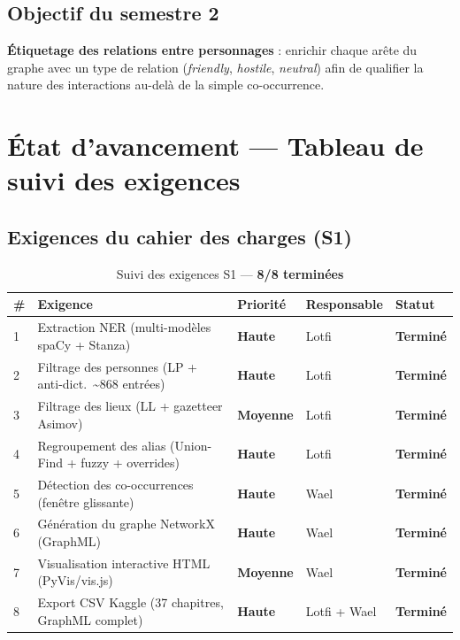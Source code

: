 \documentclass[a4paper,11pt]{article}
\newcommand{\done}{\textcolor{done}{\textbf{Terminé}}}
\newcommand{\high}{\textcolor{red!70!black}{\textbf{Haute}}}
\newcommand{\med}{\textcolor{orange!80!black}{\textbf{Moyenne}}}
\begin{document}
\subsection{Objectif du semestre 2}

\textbf{Étiquetage des relations entre personnages} : enrichir chaque arête du graphe avec un type
de relation (\textit{friendly}, \textit{hostile}, \textit{neutral}) afin de qualifier la nature des
interactions au-delà de la simple co-occurrence.

\section{État d'avancement --- Tableau de suivi des exigences}

\subsection{Exigences du cahier des charges (S1)}

\setlength{\tabcolsep}{5pt}
\renewcommand{\arraystretch}{1.25}

\begin{table}[H]
  \centering
  \footnotesize
  \begin{tabularx}{\textwidth}{>{\centering}p{0.4cm}
                               X
                               >{\centering}p{1.5cm}
                               >{\centering}p{2.0cm}
                               >{\centering\arraybackslash}p{1.8cm}}
    \toprule
    \textbf{\#} & \textbf{Exigence} & \textbf{Priorité} & \textbf{Responsable} & \textbf{Statut} \\
    \midrule
    \rowcolor{rowdone}1 & Extraction NER (multi-modèles spaCy + Stanza) & \high & Lotfi & \done \\
    \rowcolor{rowdone}2 & Filtrage des personnes (LP + anti-dict.\ \textasciitilde{}868 entrées) & \high & Lotfi & \done \\
    \rowcolor{rowdone}3 & Filtrage des lieux (LL + gazetteer Asimov) & \med & Lotfi & \done \\
    \rowcolor{rowdone}4 & Regroupement des alias (Union-Find + fuzzy + overrides) & \high & Lotfi & \done \\
    \rowcolor{rowdone}5 & Détection des co-occurrences (fenêtre glissante) & \high & Wael & \done \\
    \rowcolor{rowdone}6 & Génération du graphe NetworkX (GraphML) & \high & Wael & \done \\
    \rowcolor{rowdone}7 & Visualisation interactive HTML (PyVis/vis.js) & \med & Wael & \done \\
    \rowcolor{rowdone}8 & Export CSV Kaggle (37 chapitres, GraphML complet) & \high & Lotfi + Wael & \done \\
    \bottomrule
  \end{tabularx}
  \caption{Suivi des exigences S1 --- \textcolor{done}{\textbf{8/8 terminées}}}
\end{table}
\end{document}

